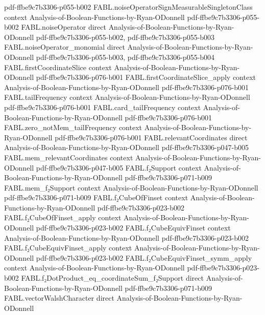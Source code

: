 \begin{theorem}
  {pdf-ffbe9c7b3306-p055-b002}
\proofstep
  {FABL.noiseOperatorSignMeasurableSingletonClass}
  {context}
  {Analysis-of-Boolean-Functions-by-Ryan-ODonnell}
  {pdf-ffbe9c7b3306-p055-b002}
\proofstep
  {FABL.noiseOperator}
  {direct}
  {Analysis-of-Boolean-Functions-by-Ryan-ODonnell}
  {pdf-ffbe9c7b3306-p055-b002,
    pdf-ffbe9c7b3306-p055-b003}
\proofstep
  {FABL.noiseOperator_monomial}
  {direct}
  {Analysis-of-Boolean-Functions-by-Ryan-ODonnell}
  {pdf-ffbe9c7b3306-p055-b003,
    pdf-ffbe9c7b3306-p055-b004}
\proofstep
  {FABL.firstCoordinateSlice}
  {context}
  {Analysis-of-Boolean-Functions-by-Ryan-ODonnell}
  {pdf-ffbe9c7b3306-p076-b001}
\proofstep
  {FABL.firstCoordinateSlice_apply}
  {context}
  {Analysis-of-Boolean-Functions-by-Ryan-ODonnell}
  {pdf-ffbe9c7b3306-p076-b001}
\proofstep
  {FABL.tailFrequency}
  {context}
  {Analysis-of-Boolean-Functions-by-Ryan-ODonnell}
  {pdf-ffbe9c7b3306-p076-b001}
\proofstep
  {FABL.card_tailFrequency}
  {context}
  {Analysis-of-Boolean-Functions-by-Ryan-ODonnell}
  {pdf-ffbe9c7b3306-p076-b001}
\proofstep
  {FABL.zero_notMem_tailFrequency}
  {context}
  {Analysis-of-Boolean-Functions-by-Ryan-ODonnell}
  {pdf-ffbe9c7b3306-p076-b001}
\proofstep
  {FABL.relevantCoordinates}
  {direct}
  {Analysis-of-Boolean-Functions-by-Ryan-ODonnell}
  {pdf-ffbe9c7b3306-p047-b005}
\proofstep
  {FABL.mem_relevantCoordinates}
  {context}
  {Analysis-of-Boolean-Functions-by-Ryan-ODonnell}
  {pdf-ffbe9c7b3306-p047-b005}
\proofstep
  {FABL.f₂Support}
  {context}
  {Analysis-of-Boolean-Functions-by-Ryan-ODonnell}
  {pdf-ffbe9c7b3306-p071-b009}
\proofstep
  {FABL.mem_f₂Support}
  {context}
  {Analysis-of-Boolean-Functions-by-Ryan-ODonnell}
  {pdf-ffbe9c7b3306-p071-b009}
\proofstep
  {FABL.f₂CubeOfFinset}
  {context}
  {Analysis-of-Boolean-Functions-by-Ryan-ODonnell}
  {pdf-ffbe9c7b3306-p023-b002}
\proofstep
  {FABL.f₂CubeOfFinset_apply}
  {context}
  {Analysis-of-Boolean-Functions-by-Ryan-ODonnell}
  {pdf-ffbe9c7b3306-p023-b002}
\proofstep
  {FABL.f₂CubeEquivFinset}
  {context}
  {Analysis-of-Boolean-Functions-by-Ryan-ODonnell}
  {pdf-ffbe9c7b3306-p023-b002}
\proofstep
  {FABL.f₂CubeEquivFinset_apply}
  {context}
  {Analysis-of-Boolean-Functions-by-Ryan-ODonnell}
  {pdf-ffbe9c7b3306-p023-b002}
\proofstep
  {FABL.f₂CubeEquivFinset_symm_apply}
  {context}
  {Analysis-of-Boolean-Functions-by-Ryan-ODonnell}
  {pdf-ffbe9c7b3306-p023-b002}
\proofstep
  {FABL.f₂DotProduct_eq_coordinateSum_f₂Support}
  {direct}
  {Analysis-of-Boolean-Functions-by-Ryan-ODonnell}
  {pdf-ffbe9c7b3306-p071-b009}
\proofstep
  {FABL.vectorWalshCharacter}
  {direct}
  {Analysis-of-Boolean-Functions-by-Ryan-ODonnell}

\end{theorem}
